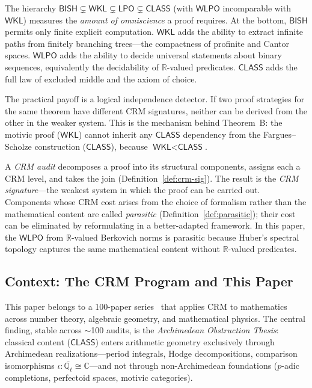 \documentclass[11pt,a4paper]{article}
\theoremstyle{plain}
\theoremstyle{definition}
\newcommand{\BISH}{\textsf{BISH}}
\newcommand{\WKL}{\textsf{WKL}}
\newcommand{\WLPO}{\textsf{WLPO}}
\newcommand{\LPO}{\textsf{LPO}}
\newcommand{\CLASS}{\textsf{CLASS}}
\newcommand{\Q}{\mathbb{Q}}
\newcommand{\R}{\mathbb{R}}
\newcommand{\C}{\mathbb{C}}
\begin{document}
The hierarchy $\BISH \subsetneq \WKL \subsetneq \LPO \subsetneq \CLASS$ (with $\WLPO$ incomparable with $\WKL$) measures the \emph{amount of omniscience} a proof requires. At the bottom, $\BISH$ permits only finite explicit computation. $\WKL$ adds the ability to extract infinite paths from finitely branching trees---the compactness of profinite and Cantor spaces. $\WLPO$ adds the ability to decide universal statements about binary sequences, equivalently the decidability of $\R$-valued predicates. $\CLASS$ adds the full law of excluded middle and the axiom of choice.

The practical payoff is a logical independence detector. If two proof strategies for the same theorem have different CRM signatures, neither can be derived from the other in the weaker system. This is the mechanism behind Theorem~B: the motivic proof ($\WKL$) cannot inherit any $\CLASS$ dependency from the Fargues--Scholze construction ($\CLASS$), because $\WKL < \CLASS$.

A \emph{CRM audit} decomposes a proof into its structural components, assigns each a CRM level, and takes the join (Definition~\ref{def:crm-sig}). The result is the \emph{CRM signature}---the weakest system in which the proof can be carried out. Components whose CRM cost arises from the choice of formalism rather than the mathematical content are called \emph{parasitic} (Definition~\ref{def:parasitic}); their cost can be eliminated by reformulating in a better-adapted framework. In this paper, the $\WLPO$ from $\R$-valued Berkovich norms is parasitic because Huber's spectral topology captures the same mathematical content without $\R$-valued predicates.

\subsection{Context: The CRM Program and This Paper}

This paper belongs to a 100-paper series~\cite{lee-p98, lee-p99, lee-p76} that applies CRM to mathematics across number theory, algebraic geometry, and mathematical physics. The central finding, stable across $\sim$100 audits, is the \emph{Archimedean Obstruction Thesis}: classical content ($\CLASS$) enters arithmetic geometry exclusively through Archimedean realizations---period integrals, Hodge decompositions, comparison isomorphisms $\iota: \overline{\Q_\ell} \cong \C$---and not through non-Archimedean foundations ($p$-adic completions, perfectoid spaces, motivic categories).
\end{document}
